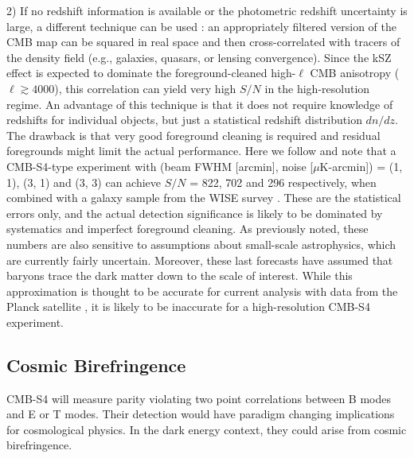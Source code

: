 2) If no redshift information is available or the photometric redshift uncertainty is large, a different technique can be used \cite{Dore:2003ex,Ferraro:2016ymw,Hill:2016dta}:  an appropriately filtered version of the CMB map can be squared in real space and then cross-correlated with tracers of the density field (e.g., galaxies, quasars, or lensing convergence).  Since the kSZ effect is expected to dominate the foreground-cleaned high-$\ell$ CMB anisotropy ($\ell \gtrsim 4000$), this correlation can yield very high $S/N$ in the high-resolution regime.  An advantage of this technique is that it does not require knowledge of redshifts for individual objects, but just a statistical redshift distribution $dn/dz$. The drawback is that very good foreground cleaning is required and residual foregrounds might limit the actual performance.  Here we follow \cite{Ferraro:2016ymw} and note that a CMB-S4-type experiment with (beam FWHM [arcmin], noise [$\mu$K-arcmin]) = (1, 1), (3, 1) and (3, 3) can achieve $S/N$ = 822, 702 and 296 respectively, when combined with a galaxy sample from the WISE survey \cite{Wright:2010qw}.  These are the statistical errors only, and the actual detection significance is likely to be dominated by systematics and imperfect foreground cleaning.  As previously noted, these numbers are also sensitive to assumptions about small-scale astrophysics, which are currently fairly uncertain. Moreover, these last forecasts have assumed that baryons trace the dark matter down to the scale of interest.  While this approximation is thought to be accurate for current analysis with data from the Planck satellite \cite{Hill:2016dta}, it is likely to be inaccurate for a high-resolution CMB-S4 experiment.


\subsection{Cosmic Birefringence}
\label{sec-biref}
CMB-S4 will measure parity violating two point correlations between B modes and  E or T modes.   Their detection would have paradigm changing implications
for cosmological physics.  In the dark energy context, they could arise from cosmic birefringence.

